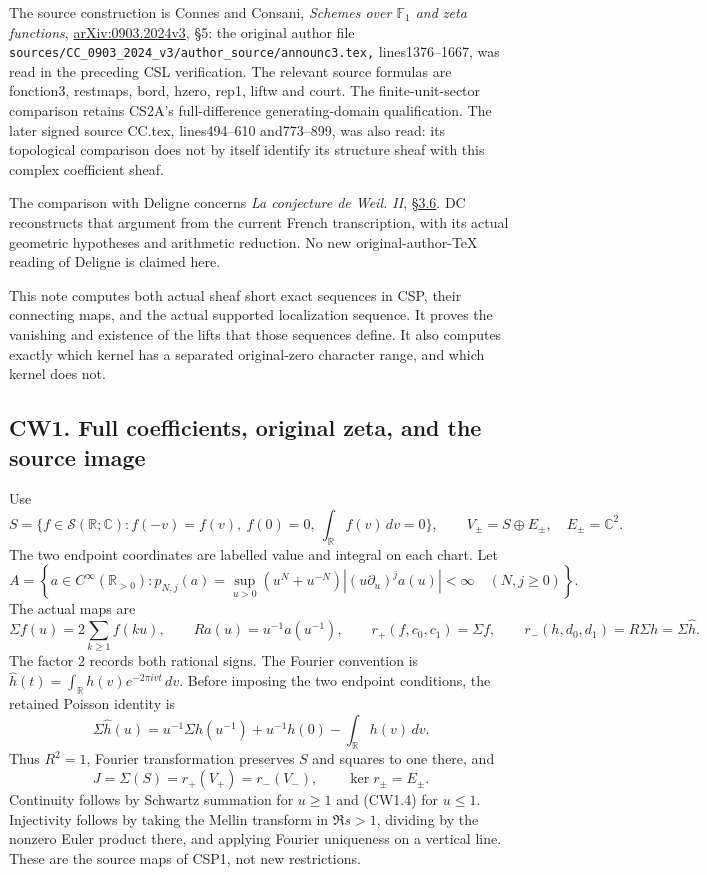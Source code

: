 The source construction is Connes and Consani, \emph{Schemes over
\(\mathbb F_1\) and zeta functions},
\href{https://arxiv.org/abs/0903.2024v3}{arXiv:0903.2024v3}, §5: the
original author file
\nolinkurl{sources/CC_0903_2024_v3/author_source/announc3.tex,}
lines1376--1667, was read in the preceding CSL verification. The
relevant source formulas are fonction3, restmaps, bord, hzero, rep1,
liftw and court. The finite-unit-sector comparison retains CS2A's
full-difference generating-domain qualification. The later signed source
CC.tex, lines494--610 and773--899, was also read: its topological
comparison does not by itself identify its structure sheaf with this
complex coefficient sheaf.

The comparison with Deligne concerns \emph{La conjecture de Weil. II},
\href{https://www.numdam.org/item/PMIHES_1980__52__137_0/}{§3.6}. DC
reconstructs that argument from the current French transcription, with
its actual geometric hypotheses and arithmetic reduction. No new
original-author-TeX reading of Deligne is claimed here.

This note computes both actual sheaf short exact sequences in CSP, their
connecting maps, and the actual supported localization sequence. It
proves the vanishing and existence of the lifts that those sequences
define. It also computes exactly which kernel has a separated
original-zero character range, and which kernel does not.

\subsection{CW1. Full coefficients, original zeta, and the source
image}\label{cw1.-full-coefficients-original-zeta-and-the-source-image}

Use \[
S=\{f\in\mathcal S(\mathbb R;\mathbb C):
f(-v)=f(v),\ f(0)=0,\ \int_{\mathbb R}f(v)\,dv=0\},
\qquad
V_\pm=S\oplus E_\pm,\quad E_\pm=\mathbb C^2.
\tag{CW1.1}
\] The two endpoint coordinates are labelled value and integral on each
chart. Let \[
A=\left\{a\in C^\infty(\mathbb R_{>0}):
p_{N,j}(a)=\sup_{u>0}(u^N+u^{-N})
|(u\partial_u)^j a(u)|<\infty\quad(N,j\ge0)\right\}.
\tag{CW1.2}
\] The actual maps are \[
\Sigma f(u)=2\sum_{k\ge1}f(ku),\qquad
Ra(u)=u^{-1}a(u^{-1}),\qquad
r_+(f,c_0,c_1)=\Sigma f,\qquad
r_-(h,d_0,d_1)=R\Sigma h=\Sigma\widehat h.
\tag{CW1.3}
\] The factor \(2\) records both rational signs. The Fourier convention
is \(\widehat h(t)=\int_{\mathbb R}h(v)e^{-2\pi ivt}\,dv\). Before
imposing the two endpoint conditions, the retained Poisson identity is
\[
\Sigma\widehat h(u)
=u^{-1}\Sigma h(u^{-1})+u^{-1}h(0)-\int_{\mathbb R}h(v)\,dv.
\tag{CW1.4}
\] Thus \(R^2=1\), Fourier transformation preserves \(S\) and squares to
one there, and \[
J=\Sigma(S)=r_+(V_+)=r_-(V_-),\qquad
\ker r_\pm=E_\pm.
\tag{CW1.5}
\] Continuity follows by Schwartz summation for \(u\ge1\) and (CW1.4)
for \(u\le1\). Injectivity follows by taking the Mellin transform in
\(\Re s>1\), dividing by the nonzero Euler product there, and applying
Fourier uniqueness on a vertical line. These are the source maps of
CSP1, not new restrictions.

